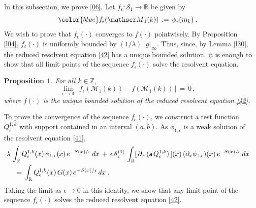 \documentclass[reqno]{amsart}
\theoremstyle{plain}
\newtheorem{proposition}[theorem]{Proposition}
\theoremstyle{definition}
\newcommand{\bb}[1]{{\mathbb #1}}
\newcommand{\ms}[1]{{\mathscr #1}}
\newcommand{\mss}[1]{{\textsf #1}}
\newcounter{as}[section]
\newcommand{\<}{\langle}
\renewcommand{\>}{\rangle}
\begin{document}
In this subsection, we prove \eqref{06}.
Let $f_\epsilon \colon \ms S_1 \to \bb R$ be given by
\begin{equation}
\label{82}
{\color{blue} f_\epsilon (\ms M_1(k))} \,:=\, \phi_\epsilon(m_k)\;.
\end{equation}
We wish to prove that $f_\epsilon(\cdot)$ converges to $f(\cdot)$
pointwisely. By Proposition \ref{l04}, $f_\epsilon(\cdot)$ is
uniformly bounded by $(1/\lambda)\, \Vert g\Vert_\infty$. Thus, since,
by Lemma \ref{l30}, the reduced resolvent equation \eqref{42} has a
unique bounded solution, it is enough to show that all limit points of
the sequence $f_{\epsilon}(\cdot)$ solve the resolvent equation.

\begin{proposition}
\label{l05}
For all $k\in \bb Z$,
\begin{equation*}
\lim_{\epsilon \to 0} 
|\, f_\epsilon(\ms M_1(k))  - f(\ms M_1(k))\, | \,=\,  0\,,
\end{equation*}
where $f(\cdot)$ is the unique bounded solution of the reduced
resolvent equation \eqref{42}.
\end{proposition}

To prove the convergence of the sequence $f_\epsilon(\cdot)$, we
construct a test function $Q_{\epsilon}^{1,k}$ with support contained
in an interval $(a,b)$. As $\phi_{1,\epsilon}$ is a weak solution of the
resolvent equation \eqref{41},
\begin{equation}
\label{17}
\begin{aligned}
& \lambda  \, \int_{\bb R} Q_{\epsilon}^{1,k} (x)\,\phi_{1,\epsilon} (x)  \, 
e^{-S(x)/\epsilon}   \, dx
\,+\, \epsilon \, \theta^{(1)}_{\epsilon}\,
\int_{\bb R} [\, \partial_x \, (\mss a \, Q_{\epsilon}^{1,k}
)\, ] (x)
\, (\partial_x \phi_{1,\epsilon}) (x) \,  e^{-S(x)/\epsilon}   \, dx
\\
& \quad \,=\, \int_{\bb R}   Q_{\epsilon}^{1,k}(x)\,  G(x)  \,
e^{-S(x)/\epsilon}    \, dx\;.
\end{aligned}
\end{equation}
Taking the limit as $\epsilon\to 0$ in this identity, we show that any
limit point of the sequence $f_\epsilon(\cdot)$ solves the reduced
resolvent equation \eqref{42}. 
\end{document}
